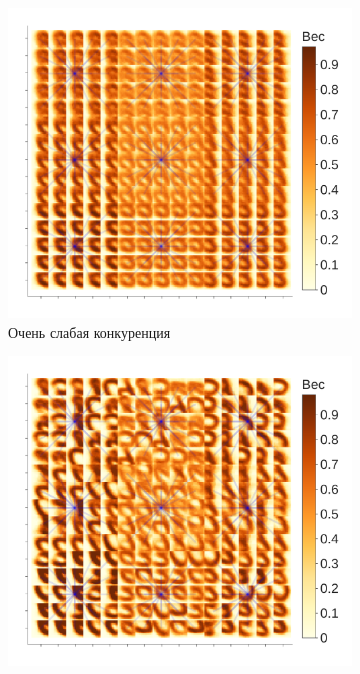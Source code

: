 \documentclass[a4paper]{article}
\begin{document}
\begin{figure}
\centering
\begin{subfigure}{0.45\textwidth} 
    \includegraphics[width=\textwidth,keepaspectratio=true]{competition_on_XY_worst_ru.pdf}
    \caption{Очень слабая конкуренция}
    \label{fig:worst_competition_distribution}
\end{subfigure}
\begin{subfigure}{0.45\textwidth}
    \includegraphics[width=\textwidth,keepaspectratio=true]{competition_on_XY_medium_bad_ru.pdf}

\end{subfigure}
\end{figure}
\end{document}
